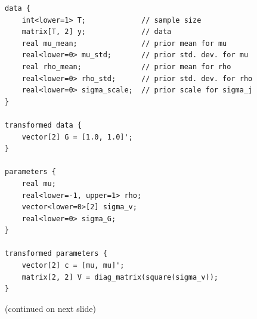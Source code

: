 
\begin{frame}[fragile]
\tiny
\begin{verbatim}
data {
    int<lower=1> T;             // sample size
    matrix[T, 2] y;             // data
    real mu_mean;               // prior mean for mu
    real<lower=0> mu_std;       // prior std. dev. for mu
    real rho_mean;              // prior mean for rho
    real<lower=0> rho_std;      // prior std. dev. for rho
    real<lower=0> sigma_scale;  // prior scale for sigma_j
}

transformed data {
    vector[2] G = [1.0, 1.0]';
}

parameters {
    real mu;
    real<lower=-1, upper=1> rho;
    vector<lower=0>[2] sigma_v;
    real<lower=0> sigma_G;
}

transformed parameters {
    vector[2] c = [mu, mu]';
    matrix[2, 2] V = diag_matrix(square(sigma_v));
}
\end{verbatim}
\normalsize
(continued on next slide)
\end{frame}

